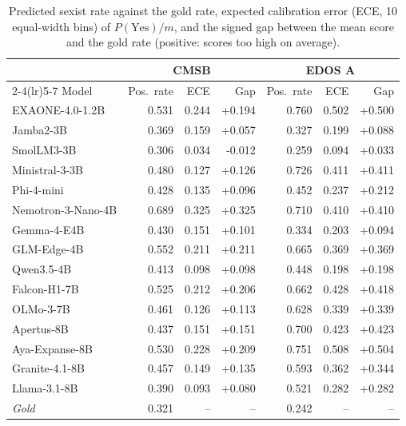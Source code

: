 \begin{table}[t]
\centering
\small
\caption{Predicted sexist rate against the gold rate, expected calibration error (ECE, 10 equal-width bins) of $P(\text{Yes})/m$, and the signed gap between the mean score and the gold rate (positive: scores too high on average).}
\label{tab:calibration}
\begin{tabular}{lrrrrrr}
\toprule
 & \multicolumn{3}{c}{CMSB} & \multicolumn{3}{c}{EDOS A} \\ \cmidrule(lr){2-4}\cmidrule(lr){5-7}
Model & Pos.\ rate & ECE & Gap & Pos.\ rate & ECE & Gap \\
\midrule
EXAONE-4.0-1.2B & 0.531 & 0.244 & +0.194 & 0.760 & 0.502 & +0.500 \\
Jamba2-3B & 0.369 & 0.159 & +0.057 & 0.327 & 0.199 & +0.088 \\
SmolLM3-3B & 0.306 & 0.034 & -0.012 & 0.259 & 0.094 & +0.033 \\
Ministral-3-3B & 0.480 & 0.127 & +0.126 & 0.726 & 0.411 & +0.411 \\
Phi-4-mini & 0.428 & 0.135 & +0.096 & 0.452 & 0.237 & +0.212 \\
Nemotron-3-Nano-4B & 0.689 & 0.325 & +0.325 & 0.710 & 0.410 & +0.410 \\
Gemma-4-E4B & 0.430 & 0.151 & +0.101 & 0.334 & 0.203 & +0.094 \\
GLM-Edge-4B & 0.552 & 0.211 & +0.211 & 0.665 & 0.369 & +0.369 \\
Qwen3.5-4B & 0.413 & 0.098 & +0.098 & 0.448 & 0.198 & +0.198 \\
Falcon-H1-7B & 0.525 & 0.212 & +0.206 & 0.662 & 0.428 & +0.418 \\
OLMo-3-7B & 0.461 & 0.126 & +0.113 & 0.628 & 0.339 & +0.339 \\
Apertus-8B & 0.437 & 0.151 & +0.151 & 0.700 & 0.423 & +0.423 \\
Aya-Expanse-8B & 0.530 & 0.228 & +0.209 & 0.751 & 0.508 & +0.504 \\
Granite-4.1-8B & 0.457 & 0.149 & +0.135 & 0.593 & 0.362 & +0.344 \\
Llama-3.1-8B & 0.390 & 0.093 & +0.080 & 0.521 & 0.282 & +0.282 \\
\midrule
\textit{Gold} & 0.321 & -- & -- & 0.242 & -- & -- \\
\bottomrule
\end{tabular}
\end{table}

